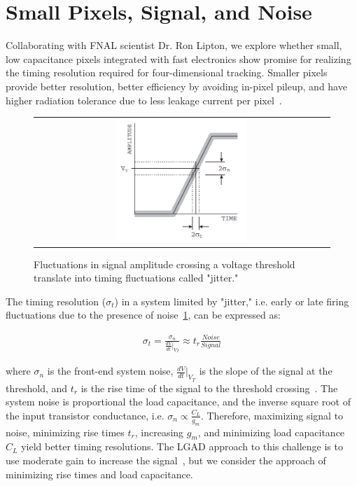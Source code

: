 \section{Small Pixels, Signal, and Noise}
Collaborating with FNAL scientist Dr. Ron Lipton, we explore whether small, low capacitance pixels integrated with fast electronics show promise for realizing the timing resolution required for four-dimensional tracking.
Smaller pixels provide better resolution, better efficiency by avoiding in-pixel pileup, and have higher radiation tolerance due to less leakage current per pixel~\cite{Garcia-Sciveres_2018}.

\begin{figure}[!htb]
  \begin{center}
    \begin{tabular}{c}
        \includegraphics[width=0.45\textwidth]{fig_FastTiming/Jitter.png}
    \end{tabular}
    \caption{Fluctuations in signal amplitude crossing a voltage threshold translate into timing fluctuations called "jitter."
            }            
    \label{Jitter}
  \end{center}
\end{figure}
The timing resolution ($\sigma_t$) in a system limited by "jitter," i.e. early or late firing fluctuations due to the presence of noise~\ref{Jitter}, can be expressed as:
\begin{linenomath*}
\begin{align}
\sigma_t =\frac{\sigma_n}{\frac{d V}{d t}\vert_{V_T}} \approx t_r\frac{Noise}{Signal}
\end{align}
\end{linenomath*}
where $\sigma_n$ is the front-end system noise, $\frac{d V}{d t}\vert_{V_T}$ is the slope of the signal at the threshold, and $t_r$ is the rise time of the signal to the threshold crossing~\cite{4336333}.
The system noise is proportional the load capacitance, and the inverse square root of the input transistor conductance, i.e. $\sigma_n \propto \frac{C_L}{g_m}$.
Therefore, maximizing signal to noise, minimizing rise times $t_r$, increasing $g_m$, and minimizing load capacitance $C_L$ yield better timing resolutions.
The LGAD approach to this challenge is to use moderate gain to increase the signal~\cite{SADROZINSKI2013226}, but we consider the approach of minimizing rise times and load capacitance.

